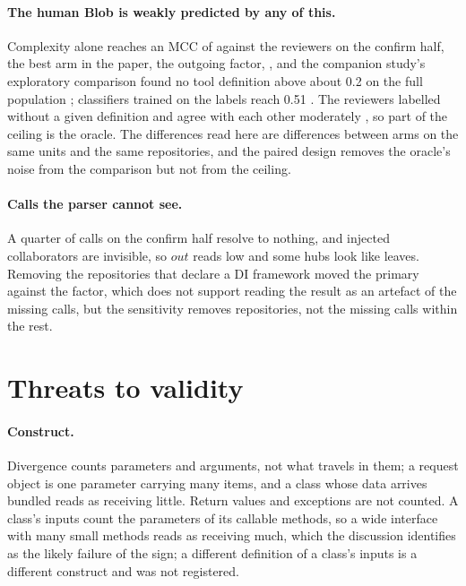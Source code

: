 \documentclass[11pt,a4paper]{article}
\begin{document}
\paragraph{The human Blob is weakly predicted by any of this.} Complexity
alone reaches an MCC of \primXMcc{} against the reviewers on the confirm
half, the best arm in the paper, the outgoing factor, \secOFlowMcc{},
and the companion
study's exploratory comparison found no tool definition above about 0.2 on
the full population \cite{paperone}; classifiers trained on the labels reach
0.51 \cite{mlcq2023}. The reviewers labelled without a given definition and
agree with each other moderately \cite{schumacher2010}, so part of the
ceiling is the oracle. The differences read here are differences between
arms on the same units and the same repositories, and the paired design
removes the oracle's noise from the comparison but not from the ceiling.

\paragraph{Calls the parser cannot see.} A quarter of calls on the confirm
half resolve to nothing, and injected collaborators are invisible, so
$\mathit{out}$ reads low and some hubs look like leaves. Removing the
repositories that declare a DI framework moved the primary against the
factor, which does not support reading the result as an artefact of the
missing calls, but the sensitivity removes repositories, not the missing
calls within the rest.

\section{Threats to validity}
\label{sec:threats}

\paragraph{Construct.} Divergence counts parameters and arguments, not
what travels in them; a request object is one parameter carrying many
items, and a class whose data arrives bundled reads as receiving little.
Return values and exceptions are not counted. A class's inputs count the
parameters of its callable methods, so a wide interface with many small
methods reads as receiving much, which the discussion identifies as the
likely failure of the sign; a different definition of a class's inputs is a
different construct and was not registered.
\end{document}

